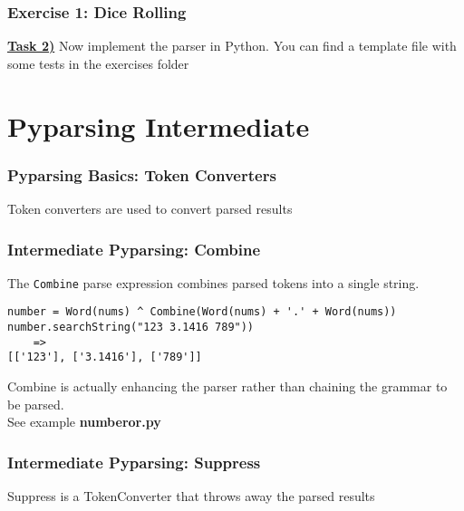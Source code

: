\documentclass{beamer}
\begin{document}
\begin{frame}
\frametitle{Exercise 1: Dice Rolling}
\textbf{\underline{Task 2)}} Now implement the parser in Python. You can find a template file with some tests in the exercises folder
\end{frame}



\section{Pyparsing Intermediate}

\begin{frame}
\frametitle{Pyparsing Basics: Token Converters}
Token converters are used to convert parsed results
\begin{center}
\end{center}

\end{frame}


\begin{frame}[fragile]
\frametitle{Intermediate Pyparsing: Combine}
The \texttt{Combine} parse expression combines parsed tokens into a single string.

\begin{verbatim}
number = Word(nums) ^ Combine(Word(nums) + '.' + Word(nums))
number.searchString("123 3.1416 789"))
    =>
[['123'], ['3.1416'], ['789']]
\end{verbatim}
Combine is actually enhancing the parser rather than chaining the grammar to be parsed. \\
\medskip
See example \textbf{numberor.py}
\end{frame}



\begin{frame}
\frametitle{Intermediate Pyparsing: Suppress}
Suppress is a TokenConverter that throws away the parsed results
\begin{center}
\end{center}

\end{frame}
\end{document}
